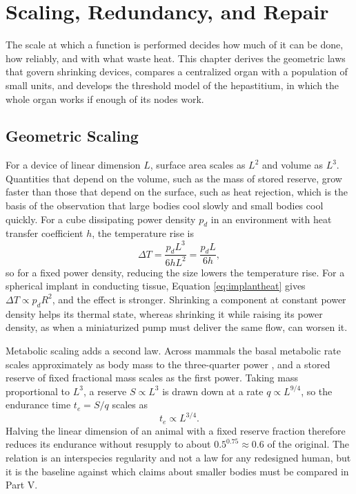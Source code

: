 \documentclass[11pt,openany]{book}
\theoremstyle{definition}
\theoremstyle{remark}
\begin{document}
\chapter{Scaling, Redundancy, and Repair}
\label{ch:scaling}

The scale at which a function is performed decides how much of it can be done, how reliably, and with what waste heat. This chapter derives the geometric laws that govern shrinking devices, compares a centralized organ with a population of small units, and develops the threshold model of the hepastitium, in which the whole organ works if enough of its nodes work.

\section{Geometric Scaling}

For a device of linear dimension $L$, surface area scales as $L^{2}$ and volume as $L^{3}$. Quantities that depend on the volume, such as the mass of stored reserve, grow faster than those that depend on the surface, such as heat rejection, which is the basis of the observation that large bodies cool slowly and small bodies cool quickly. For a cube dissipating power density $p_d$ in an environment with heat transfer coefficient $h$, the temperature rise is
\begin{equation}
\Delta T=\frac{p_d L^{3}}{6hL^{2}}=\frac{p_d L}{6h},
\label{eq:cube}
\end{equation}
so for a fixed power density, reducing the size lowers the temperature rise. For a spherical implant in conducting tissue, Equation \eqref{eq:implantheat} gives $\Delta T\propto p_d R^{2}$, and the effect is stronger. Shrinking a component at constant power density helps its thermal state, whereas shrinking it while raising its power density, as when a miniaturized pump must deliver the same flow, can worsen it.

Metabolic scaling adds a second law. Across mammals the basal metabolic rate scales approximately as body mass to the three-quarter power \cite{kleiber1932,west1997}, and a stored reserve of fixed fractional mass scales as the first power. Taking mass proportional to $L^{3}$, a reserve $S\propto L^{3}$ is drawn down at a rate $q\propto L^{9/4}$, so the endurance time $t_e=S/q$ scales as
\begin{equation}
t_e\propto L^{3/4}.
\label{eq:endurance}
\end{equation}
Halving the linear dimension of an animal with a fixed reserve fraction therefore reduces its endurance without resupply to about $0.5^{0.75}\approx0.6$ of the original. The relation is an interspecies regularity and not a law for any redesigned human, but it is the baseline against which claims about smaller bodies must be compared in Part V.
\end{document}
